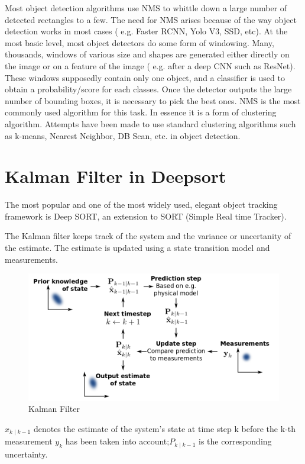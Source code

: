             Most object detection algorithms use NMS to whittle down a large number of detected rectangles to a few. The need for NMS arises because of the way object detection works in most cases ( e.g. Faster RCNN, Yolo V3, SSD, etc). At the most basic level, most object detectors do some form of windowing. Many, thousands, windows of various size and shapes are generated either directly on the image or on a feature of the image ( e.g. after a deep CNN such as ResNet). These windows supposedly contain only one object, and a classifier is used to obtain a probability/score for each classes. Once the detector outputs the large number of bounding boxes, it is necessary to pick the best ones. NMS is the most commonly used algorithm for this task. In essence it is a form of clustering algorithm. Attempts have been made to use standard clustering algorithms such as k-means, Nearest Neighbor, DB Scan, etc. in object detection.
            \pagebreak
        \section{Kalman Filter in Deepsort}
            The most popular and one of the most widely used, elegant object tracking framework is Deep SORT, an extension to SORT (Simple Real time Tracker). 
                
            
            The Kalman filter keeps track of the system and the variance or uncertanity of the estimate. The estimate is updated using a state transition model and measurements.
            \begin{figure}[ht]
                \centering
                \includegraphics[scale=0.4]{img/kalman.png}
                \caption{Kalman Filter}
                \label{fig:Feature of COCO dataset}
            \end{figure}


            ${\hat {x}}_{k\mid k-1}$ denotes the estimate of the system's state at
            time step k before the k-th measurement ${y_k}$ has been taken into
            account;$P_{k\mid k-1}$ is the corresponding uncertainty.
                        
